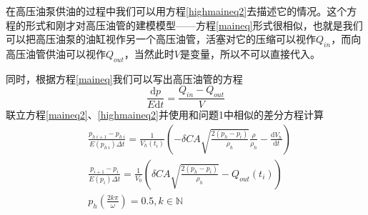\documentclass[12pt,AutoFakeBold]{article}%
\newcommand{\dif}{\mathrm{d}}
\begin{document}
    在高压油泵供油的过程中我们可以用方程\ref{highmaineq2}去描述它的情况。这个方程的形式和刚才对高压油管的建模模型——方程\ref{maineq}形式很相似，也就是我们可以把高压油泵的油缸视作另一个高压油管，活塞对它的压缩可以视作$Q_{in}$，而向高压油管供油可以视作$Q_{out}$，当然此时$V$是变量，所以不可以直接代入。\par
    同时，根据方程\ref{maineq}我们可以写出高压油管的方程
    \begin{equation}
        \frac{\dif p}{E\dif t}=\frac{Q_{in}-Q_{out}}{V}
        \label{maineq2}
    \end{equation}
    联立方程\ref{maineq2}、\ref{highmaineq2}并使用和问题1中相似的差分方程计算
    \begin{equation}
        \begin{aligned}
            &\frac{p_{h\ i+1}-p_{h\ i}}{E(p_{h\ i})\Delta t}=\frac{1}{V_h(t_i)}\left(-\delta CA\sqrt{\frac{2\left(p_h-p_i\right)}{\rho_h}}\frac{\rho}{\rho_h}-\frac{\dif V_h}{\dif t}\right)\\
            &\frac{p_{i+1}-p_i}{E(p_i)\Delta t}=\frac{1}{V_0}\left(\delta CA\sqrt{\frac{2\left(p_h-p_i\right)}{\rho_h}}-Q_{out}(t_i)\right)\\
            &p_h(\frac{2k\pi}{\omega})=0.5,k\in\mathbb{N}
        \end{aligned}
    \end{equation}

        
\end{document}
